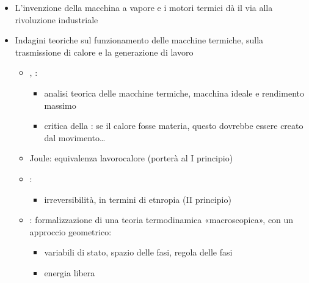 \documentclass[letterpaper,10pt,italian]{jupyterBook}
\begin{document}
\sphinxAtStartPar
{}
\begin{itemize}
\item {} 
\sphinxAtStartPar
L’invenzione della macchina a vapore e i motori termici dà il via alla rivoluzione industriale

\item {} 
\sphinxAtStartPar
Indagini teoriche sul funzionamento delle macchine termiche, sulla trasmissione di calore e la generazione di lavoro
\begin{itemize}
\item {} 
,  :
\begin{itemize}
\item {} 
\sphinxAtStartPar
analisi teorica delle macchine termiche, macchina ideale e rendimento massimo

\item {} 
\sphinxAtStartPar
critica della : se il calore fosse materia, questo dovrebbe essere creato dal movimento…

\end{itemize}

\item {} 
\sphinxAtStartPar
Joule: equivalenza lavoro\sphinxhyphen{}calore (porterà al I principio)

\item {} 
\sphinxAtStartPar
{}:
\begin{itemize}
\item {} 
\sphinxAtStartPar
irreversibilità, in termini di etnropia (II principio)

\end{itemize}

\item {} 
\sphinxAtStartPar
{}: formalizzazione di una teoria termodinamica «macroscopica», con un approccio geometrico:
\begin{itemize}
\item {} 
\sphinxAtStartPar
variabili di stato, spazio delle fasi, regola delle fasi

\item {} 
\sphinxAtStartPar
energia libera

\end{itemize}

\end{itemize}

\end{itemize}
\end{document}
